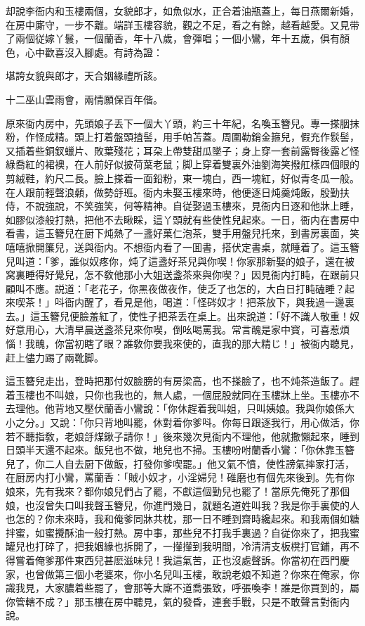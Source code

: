却說李衙内和玉樓兩個，女貌郎才，如魚似水，正合着油瓶蓋上，每日燕爾新婚，在房中廝守，一步不離。端詳玉樓容貌，觀之不足，看之有餘，越看越愛。又見带了兩個従嫁丫鬟，一個蘭香，年十八歲，會彈唱；一個小鸞，年十五歲，俱有顏色，心中歡喜沒入腳處。有詩為證：

\begin{myquote}
堪誇女貌與郎才，天合姻緣禮所該。

十二巫山雲雨會，兩情願保百年偕。
\end{myquote}

原來衙内房中，先頭娘子丢下一個大丫頭，約三十年紀，名喚玉簪兒。專一搽胭抹粉，作怪成精。頭上打着盤頭揸髻，用手帕苫蓋。周圍勒銷金箍兒，假充作䯼髻，又插着些銅釵蠟片、敗葉殘花；耳朶上帶雙甜瓜墜子；身上穿一套前露臀後露ど怪綠喬紅的裙襖，在人前好似披荷葉老鼠；脚上穿着雙裏外油劉海笑撥舡樣四個眼的剪絨鞋，約尺二長。臉上搽着一面鉛粉，東一塊白，西一塊紅，好似青冬瓜一般。在人跟前輕聲浪顙，做勢㧱班。衙内未娶玉樓來時，他便逐日炖羹炖飯，殷勤扶侍，不說強說，不笑強笑，何等精神。自従娶過玉樓來，見衙内日逐和他牀上睡，如膠似漆般打熱，把他不去瞅睬，這丫頭就有些使性兒起來。一日，衙内在書房中看書，這玉簪兒在厨下炖熱了一盞好菓仁泡茶，雙手用盤兒托來，到書房裏面，笑嘻嘻掀開簾兒，送與衙内。不想衙内看了一囬書，搭伏定書桌，就睡着了。這玉簪兒叫道：「爹，誰似奴疼你，炖了這盞好茶兒與你喫！你家那新娶的娘子，還在被窝裏睡得好覺兒，怎不敎他那小大姐送盞茶來與你喫？」因見衙内打盹，在跟前只顧叫不應。説道：「老花子，你黑夜做夜作，使乏了也怎的，大白日打盹磕睡？起來喫茶！」呌衙内醒了，看見是他，喝道：「怪硶奴才！把茶放下，與我過一邊裏去。」這玉簪兒便臉羞紅了，使性子把茶丢在桌上。出來說道：「好不識人敬重！奴好意用心，大清早晨送盞茶兒來你喫，倒吆喝罵我。常言醜是家中寳，可喜惹煩惱！我醜，你當初瞎了眼？誰敎你要我來使的，直我的那大精じ！」被衙内聽見，赶上儘力踢了兩靴脚。

這玉簪兒走出，登時把那付奴臉膀的有房梁高，也不搽臉了，也不炖茶造飯了。趕着玉樓也不叫娘，只你也我也的，無人處，一個屁股就同在玉樓牀上坐。玉樓亦不去理他。他背地又壓伏蘭香小鸞說：「你休趕着我叫姐，只叫姨娘。我與你娘係大小之分。」又說：「你只背地叫罷，休對着你爹呌。你每日跟逐我行，用心做活，你若不聽指敎，老娘㧱煤鍬子請你！」後來幾次見衙内不理他，他就撒懶起來，睡到日頭半天還不起來。飯兒也不做，地兒也不掃。玉樓吩咐蘭香小鸞：「你休靠玉簪兒了，你二人自去厨下做飯，打發你爹喫罷。」他又氣不憤，使性謗氣摔家打活，在厨房内打小鸞，罵蘭香：「賊小奴才，小淫婦兒！碓磨也有個先來後到。先有你娘來，先有我來？都你娘兒們占了罷，不獻這個勤兒也罷了！當原先俺死了那個娘，也沒曾失口叫我聲玉簪兒，你進門幾日，就題名道姓叫我？我是你手裏使的人也怎的？你未來時，我和俺爹同牀共枕，那一日不睡到齋時纔起來。和我兩個如糖拌蜜，如蜜攪酥油一般打熱。房中事，那些兒不打我手裏過？自従你來了，把我蜜罐兒也打碎了，把我姻緣也拆開了，一攆攆到我明間，冷清清支板櫈打官鋪，再不得嘗着俺爹那件東西兒甚麽滋味兒！我這氣苦，正也沒處聲訴。你當初在西門慶家，也曾做第三個小老婆來，你小名兒叫玉樓，敢說老娘不知道？你來在俺家，你識我見，大家膿着些罷了，會那等大廝不道喬張致，呼張喚李！誰是你買到的，屬你管轄不成？」那玉樓在房中聽見，氣的發昏，連套手戰，只是不敢聲言對衙内說。


